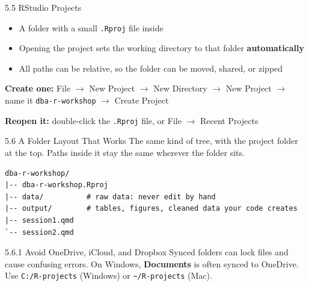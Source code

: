 \documentclass[
  ignorenonframetext,
  aspectratio=169,
]{beamer}
\providecommand{\tightlist}{%
  \setlength{\itemsep}{0pt}\setlength{\parskip}{0pt}}
\begin{document}
\begin{frame}[fragile]{5.5 RStudio Projects}
\protect{}\label{sec-projects}
\begin{itemize}
\tightlist
\item
  A folder with a small \texttt{.Rproj} file inside
\item
  Opening the project sets the working directory to that folder
  \textbf{automatically}
\item
  All paths can be relative, so the folder can be moved, shared, or
  zipped
\end{itemize}

\textbf{Create one:} File \(\rightarrow\) New Project \(\rightarrow\)
New Directory \(\rightarrow\) New Project \(\rightarrow\) name it
\texttt{dba-r-workshop} \(\rightarrow\) Create Project

\textbf{Reopen it:} double-click the \texttt{.Rproj} file, or File
\(\rightarrow\) Recent Projects
\end{frame}

\begin{frame}[fragile]{5.6 A Folder Layout That Works}
\protect{}\label{a-folder-layout-that-works}
The same kind of tree, with the project folder at the top. Paths inside
it stay the same wherever the folder sits.

\begin{verbatim}
dba-r-workshop/
|-- dba-r-workshop.Rproj
|-- data/          # raw data: never edit by hand
|-- output/        # tables, figures, cleaned data your code creates
|-- session1.qmd
`-- session2.qmd
\end{verbatim}

\begin{alertblock}{5.6.1 Avoid OneDrive, iCloud, and Dropbox}
\protect{}\label{avoid-onedrive-icloud-and-dropbox}
Synced folders can lock files and cause confusing errors. On Windows,
\textbf{Documents} is often synced to OneDrive. Use
\texttt{C:/R-projects} (Windows) or
\texttt{\textasciitilde{}/R-projects} (Mac).
\end{alertblock}
\end{frame}
\end{document}
